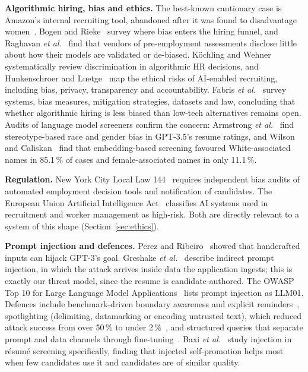 \documentclass[conference]{IEEEtran}
\begin{document}
\textbf{Algorithmic hiring, bias and ethics.} The best-known cautionary case is
Amazon's internal recruiting tool, abandoned after it was found to disadvantage
women~\cite{b7}. Bogen and Rieke~\cite{b8} survey where bias enters the hiring
funnel, and Raghavan \textit{et al.}~\cite{b9} find that vendors of
pre-employment assessments disclose little about how their models are validated
or de-biased. K\"ochling and Wehner~\cite{b10} systematically review
discrimination in algorithmic HR decisions, and Hunkenschroer and
Luetge~\cite{b11} map the ethical risks of AI-enabled recruiting, including
bias, privacy, transparency and accountability. Fabris \textit{et
al.}~\cite{b12} survey systems, bias measures, mitigation strategies, datasets
and law, concluding that whether algorithmic hiring is less biased than low-tech
alternatives remains open. Audits of language model screeners confirm the
concern: Armstrong \textit{et al.}~\cite{b13} find stereotype-based race and
gender bias in GPT-3.5's resume ratings, and Wilson and Caliskan~\cite{b14} find
that embedding-based screening favoured White-associated names in 85.1\,\% of
cases and female-associated names in only 11.1\,\%.

\textbf{Regulation.} New York City Local Law 144~\cite{b15} requires independent
bias audits of automated employment decision tools and notification of
candidates. The European Union Artificial Intelligence Act~\cite{b16} classifies
AI systems used in recruitment and worker management as high-risk. Both are
directly relevant to a system of this shape (Section~\ref{sec:ethics}).

\textbf{Prompt injection and defences.} Perez and Ribeiro~\cite{b17} showed that
handcrafted inputs can hijack GPT-3's goal. Greshake \textit{et al.}~\cite{b18}
describe indirect prompt injection, in which the attack arrives inside data the
application ingests; this is exactly our threat model, since the resume is
candidate-authored. The OWASP Top 10 for Large Language Model
Applications~\cite{b19} lists prompt injection as LLM01. Defences include
benchmark-driven boundary awareness and explicit reminders~\cite{b20},
spotlighting (delimiting, datamarking or encoding untrusted text), which reduced
attack success from over 50\,\% to under 2\,\%~\cite{b21}, and structured
queries that separate prompt and data channels through fine-tuning~\cite{b22}.
Baxi \textit{et al.}~\cite{b23} study injection in r\'esum\'e screening
specifically, finding that injected self-promotion helps most when few
candidates use it and candidates are of similar quality.
\end{document}
